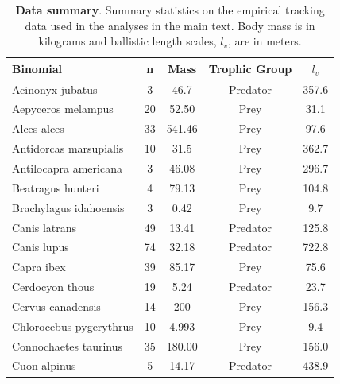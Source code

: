 \documentclass[12pt]{article}
\begin{document}
\begin{table}[!h]
\begin{center}
\tiny
\caption{\textbf{Data summary}. Summary statistics on the empirical tracking data used in the analyses in the main text. Body mass is in kilograms and ballistic length scales, $l_v$, are in meters.\\}
\label{tab:data_summary}
\begin{tabular}{lcccc}
\hline
\textbf{Binomial}                 & \textbf{n} & \textbf{Mass} & \textbf{Trophic Group} & \textbf{$l_v$} \\ \hline
Acinonyx jubatus                  & 3          & 46.7          & Predator      & 357.6          \\
Aepyceros melampus                & 20         & 52.50         & Prey          & 31.1           \\
Alces alces                       & 33         & 541.46        & Prey          & 97.6           \\
Antidorcas marsupialis            & 10         & 31.5          & Prey          & 362.7          \\
Antilocapra americana             & 3          & 46.08         & Prey          & 296.7          \\
Beatragus hunteri                 & 4          & 79.13         & Prey          & 104.8          \\
Brachylagus idahoensis            & 3          & 0.42          & Prey          & 9.7            \\
Canis latrans                     & 49         & 13.41         & Predator      & 125.8          \\
Canis lupus                       & 74         & 32.18         & Predator      & 722.8          \\
Capra ibex                        & 39         & 85.17         & Prey          & 75.6           \\
Cerdocyon thous                   & 19         & 5.24          & Predator      & 23.7           \\
Cervus canadensis                 & 14         & 200           & Prey          & 156.3          \\
Chlorocebus pygerythrus           & 10         & 4.993         & Prey          & 9.4            \\
Connochaetes taurinus             & 35         & 180.00        & Prey          & 156.0          \\
Cuon alpinus                      & 5          & 14.17         & Predator      & 438.9          \\

\end{tabular}
\end{center}
\end{table}
\end{document}
